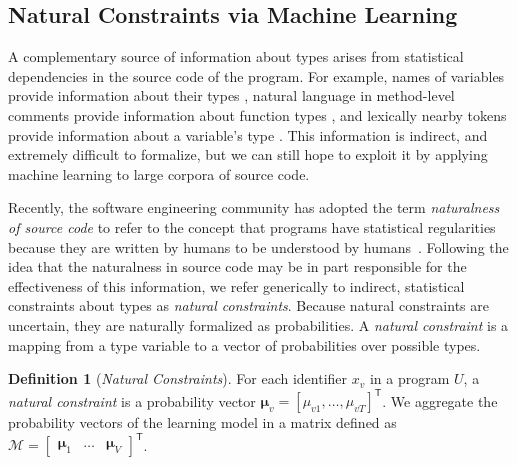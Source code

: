 \documentclass[sigplan,10pt,review,anonymous]{acmart} %
\theoremstyle{plain}
\theoremstyle{remark}
\theoremstyle{definition}
\newtheorem{defn}{Definition}[section]
\begin{document}
\subsection{Natural Constraints via Machine Learning}\label{ssec:natcon}

A complementary source of information about types arises from statistical dependencies
in the source code of the program.  For example, names of variables provide
information about their types \cite{xu16}, natural language in
method-level comments provide information about function types \cite{malik19},
and lexically nearby tokens provide information
about a variable's type \cite{hellendoorn18}.
This information is indirect, and extremely difficult to formalize,
but we can still hope to exploit it by applying machine learning
to large corpora of source code.

Recently, the software engineering
community has adopted the term \emph{naturalness of source code} to refer to
the concept that programs have statistical regularities because
they are written by humans to be
understood by humans~\citep{hindle12}.
Following the idea that the naturalness in source code may be in part responsible
for the effectiveness of this information, we
refer generically to indirect, statistical
constraints about types as \emph{natural constraints}.
Because natural constraints are uncertain, they are naturally formalized
as probabilities.
A \emph{natural constraint} is a mapping from a type variable to a vector
of probabilities
over possible types.
\begin{defn}[\emph{Natural Constraints}]\label{eq:natural}
	For each identifier $x_v$ in a program $U$,
	a \emph{natural constraint} is a probability vector $\bm{\mu}_v = [\mu_{v1}, \ldots, \mu_{vT}]^\mathsf{T}$.
	We aggregate the probability vectors of the learning model in a matrix
	defined as $\mathcal{M} = \begin{bmatrix} \bm{\mu}_1 & \ldots & \bm{\mu}_{V} \end{bmatrix}^\mathsf{T}$.
\end{defn}
\end{document}
